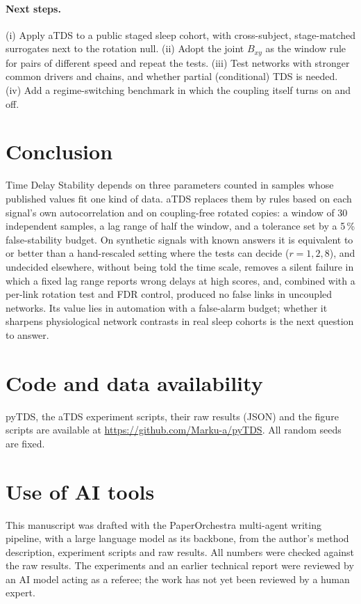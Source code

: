 \documentclass[11pt,a4paper]{article}
\begin{document}
\paragraph{Next steps.} (i) Apply aTDS to a public staged sleep cohort, with cross-subject, stage-matched surrogates next to the rotation null. (ii) Adopt the joint $B_{xy}$ as the window rule for pairs of different speed and repeat the tests. (iii) Test networks with stronger common drivers and chains, and whether partial (conditional) TDS is needed. (iv) Add a regime-switching benchmark in which the coupling itself turns on and off.

\section{Conclusion}
\label{sec:conclusion}
Time Delay Stability depends on three parameters counted in samples whose published values fit one kind of data. aTDS replaces them by rules based on each signal's own autocorrelation and on coupling-free rotated copies: a window of 30 independent samples, a lag range of half the window, and a tolerance set by a 5\,\% false-stability budget. On synthetic signals with known answers it is equivalent to or better than a hand-rescaled setting where the tests can decide ($r = 1, 2, 8$), and undecided elsewhere, without being told the time scale, removes a silent failure in which a fixed lag range reports wrong delays at high scores, and, combined with a per-link rotation test and FDR control, produced no false links in uncoupled networks. Its value lies in automation with a false-alarm budget; whether it sharpens physiological network contrasts in real sleep cohorts is the next question to answer.

\section*{Code and data availability}
pyTDS, the aTDS experiment scripts, their raw results (JSON) and the figure scripts are available at \url{https://github.com/Marku-a/pyTDS}. All random seeds are fixed.

\section*{Use of AI tools}
This manuscript was drafted with the PaperOrchestra multi-agent writing pipeline, with a large language model as its backbone, from the author's method description, experiment scripts and raw results. All numbers were checked against the raw results. The experiments and an earlier technical report were reviewed by an AI model acting as a referee; the work has not yet been reviewed by a human expert.




\end{document}
